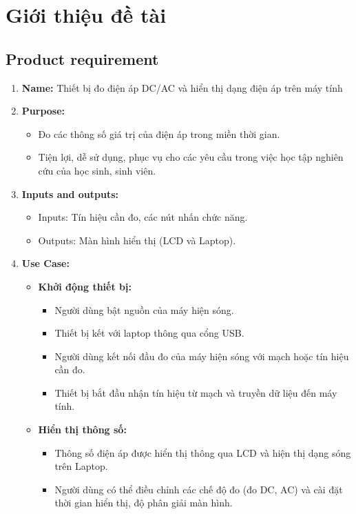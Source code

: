 \fontsize{13}{14}\selectfont
\chapter{Giới thiệu đề tài}
\newpage
\section{Product requirement}
\begin{enumerate}[label=\alph*)]
	\item \textbf{Name: } Thiết bị đo điện áp DC/AC và hiển thị dạng điện áp trên máy tính
	\item \textbf{Purpose: }
	\begin{itemize}[label=+]
		\item Đo các thông số giá trị của điện áp trong miền thời gian.
		\item Tiện lợi, dễ sử dụng, phục vụ cho các yêu cầu trong việc học tập nghiên cứu của học sinh, sinh viên.
	\end{itemize}
	\item \textbf{Inputs and outputs: }
	\begin{itemize}[label=+]
		\item Inputs: Tín hiệu cần đo, các nút nhấn chức năng.
		\item Outputs: Màn hình hiển thị (LCD và Laptop).
	\end{itemize}
	\item \textbf{Use Case:}
	\begin{itemize}[label=-]
		\item \textbf{Khởi động thiết bị:} 
		\begin{itemize}[label=+]
			\item Người dùng bật nguồn của máy hiện sóng.
			\item Thiết bị kết với laptop thông qua cổng USB.
			\item Người dùng kết nối đầu đo của máy hiện sóng với mạch hoặc tín hiệu cần đo.
			\item Thiết bị bắt đầu nhận tín hiệu từ mạch và truyền dữ liệu đến máy tính.
		\end{itemize}
		\item \textbf{Hiển thị thông số:} 
		\begin{itemize}[label=+]
			\item Thông số điện áp được hiển thị thông qua LCD và hiện thị dạng sóng trên Laptop.
			\item Người dùng có thể điều chỉnh các chế độ đo (đo DC, AC) và cài đặt thời gian hiển thị, độ phân giải màn hình.

\end{itemize}
\end{itemize}
\end{enumerate}
